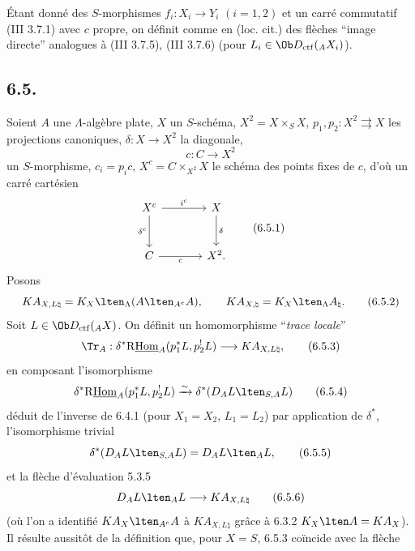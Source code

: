 Étant donné des $S$-morphismes $f_i:X_i\to Y_i$ $(i=1,2)$ et un carré commutatif (III 3.7.1) avec $c$ propre, on définit comme en (loc. cit.) des flèches ``image directe'' analogues à (III 3.7.5), (III 3.7.6) (pour $L_i\in\Ob D_{\mathrm{ctf}}({}_AX_i)$).

\subsection*{6.5.}
Soient $A$ une $\Lambda$-algèbre plate, $X$ un $S$-schéma, $X^2=X\times_SX$, $p_1,p_2:X^2\rightrightarrows X$ les projections canoniques, $\delta:X\to X^2$ la diagonale,
\[
c:C\longrightarrow X^2
\]
un $S$-morphisme, $c_i=p_ic$, $X^c=C\times_{X^2}X$ le schéma des points fixes de $c$, d'où un carré cartésien
\begin{equation}
\begin{tikzcd}[column sep=large,row sep=large]
X^c \arrow[r,"i^c"] \arrow[d,"\delta^c"'] & X \arrow[d,"\delta"]\\
C \arrow[r,"c"'] & X^2 .
\end{tikzcd}
\tag{6.5.1}
\end{equation}
Posons
\begin{equation}
KA_{X,L\natural}=K_X\lten_{\Lambda}(A\lten_{A^e}A),
\qquad
KA_{X,\natural}=K_X\lten_{\Lambda}A_{\natural}.
\tag{6.5.2}
\end{equation}
Soit $L\in\Ob D_{\mathrm{ctf}}({}_AX)$. On définit un homomorphisme ``\emph{trace locale}''
\begin{equation}
\Tr_A:\delta^*\mathrm{R}\underline{\mathrm{Hom}}_A(p_1^*L,p_2^!L)
\longrightarrow
KA_{X,L\natural},
\tag{6.5.3}
\end{equation}
en composant l'isomorphisme
\begin{equation}
\delta^*\mathrm{R}\underline{\mathrm{Hom}}_A(p_1^*L,p_2^!L)
\xrightarrow{\sim}
\delta^*(D_AL\lten_{S,A}L)
\tag{6.5.4}
\end{equation}
déduit de l'inverse de 6.4.1 (pour $X_1=X_2$, $L_1=L_2$) par application de $\delta^*$, l'isomorphisme trivial
\begin{equation}
\delta^*(D_AL\lten_{S,A}L)=D_AL\lten_AL,
\tag{6.5.5}
\end{equation}
et la flèche d'évaluation 5.3.5
\begin{equation}
D_AL\lten_AL\longrightarrow KA_{X,L\natural}
\tag{6.5.6}
\end{equation}
(où l'on a identifié $KA_X\lten_{A^e}A$ à $KA_{X,L\natural}$ grâce à 6.3.2 $K_X\lten A=KA_X$). Il résulte aussitôt de la définition que, pour $X=S$, 6.5.3 coïncide avec la flèche
